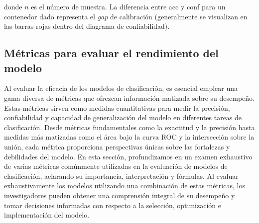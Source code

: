\documentclass[10pt, oneside, a4paper]{article}
\begin{document}
	donde $n$ es el número de muestra. La diferencia entre acc y conf para un contenedor dado representa el \textsl{gap} de calibración (generalmente se visualizan en las barras rojas dentro del diagrama de confiabilidad). 
		
	\subsection{Métricas para evaluar el rendimiento del modelo}	
	
	Al evaluar la eficacia de los modelos de clasificación, es esencial emplear una gama diversa de métricas que ofrezcan información matizada sobre su desempeño. Estas métricas sirven como medidas cuantitativas para medir la precisión, confiabilidad y capacidad de generalización del modelo en diferentes tareas de clasificación. Desde métricas fundamentales como la exactitud y la precisión hasta medidas más matizadas como el área bajo la curva ROC y la intersección sobre la unión, cada métrica proporciona perspectivas únicas sobre las fortalezas y debilidades del modelo. En esta sección, profundizamos en un examen exhaustivo de varias métricas comúnmente utilizadas en la evaluación de modelos de clasificación, aclarando su importancia, interpretación y fórmulas. Al evaluar exhaustivamente los modelos utilizando una combinación de estas métricas, los investigadores pueden obtener una comprensión integral de su desempeño y tomar decisiones informadas con respecto a la selección, optimización e implementación del modelo.
	
\end{document}
